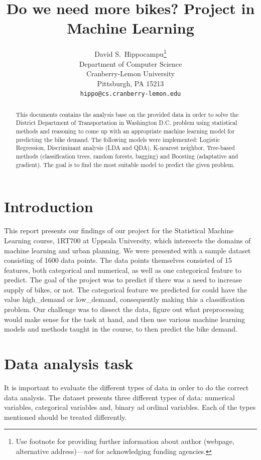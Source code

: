 \documentclass{article}
\title{Do we need more bikes? Project in Machine Learning}
\author{%
  David S.~Hippocampu\thanks{Use footnote for providing further information
    about author (webpage, alternative address)---\emph{not} for acknowledging
    funding agencies.} \\
  Department of Computer Science\\
  Cranberry-Lemon University\\
  Pittsburgh, PA 15213 \\
  \texttt{hippo@cs.cranberry-lemon.edu} \\
}
\begin{document}
\maketitle


\begin{abstract}
   This documents contains the analysis base on the provided data in order to solve the District Department of Transportation in Washington D.C. problem using statistical methods and reasoning to come up with an appropriate machine learning model for predicting the bike demand. The following models were implemented: Logistic Regression, Discriminant analysis (LDA and QDA), K-nearest neighbor, Tree-based methods (classification trees, random forests, bagging) and Boosting (adaptative and gradient). The goal is to find the most suitable model to predict the given problem.

\end{abstract}

\section{Introduction}

This report presents our findings of our project for the Statistical Machine Learning course, 1RT700 at Uppsala University, which intersects the domains of machine learning and urban planning.
We were presented with a sample dataset consisting of 1600 data points. The data points themselves consisted of 15 features, both categorical and numerical, as well as one categorical feature to predict.
The goal of the project was to predict if there was a need to increase supply of bikes, or not. The categorical feature we predicted for could have the value high\_demand or low\_demand, consequently making this a classification problem.
Our challenge was to dissect the data, figure out what preprocessing would make sense for the task at hand, and then use various machine learning models and methods taught in the course, to then predict the bike demand.

\section{Data analysis task}
\label{headings}

It is important to evaluate the different types of data in order to do the correct data analysis. The dataset presents three different types of data: numerical variables, categorical variables and, binary ad ordinal variables. Each of the types mentioned should be treated differently.
\end{document}
